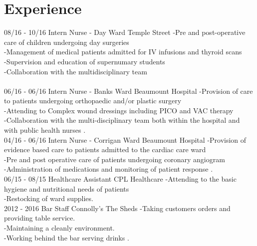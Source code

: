 \documentclass[]{friggeri-cv}
\begin{document}
\section{Experience}
\begin{entrylist}
  \entry
    {08/16 - 10/16}
    {Intern Nurse - Day Ward}
    {Temple Street}
    {-Pre and post-operative care of children undergoing day surgeries\\
-Management of medical patients admitted for IV infusions and thyroid scans\\
-Supervision and education of supernumary students\\
-Collaboration with the multidisciplinary team\\ 
\\}
  \entry
    {06/16 - 06/16}
    {Intern Nurse - Banks Ward}
    {Beaumount Hospital}
    {-Provision of care to patients undergoing orthopaedic and/or plastic surgery\\
-Attending to Complex wound dressings including PICO and VAC therapy\\
-Collaboration with the multi-disciplinary team both within the hospital and with public health nurses
.\\}
  \entry
    {04/16 - 06/16}
    {Intern Nurse - Corrigan Ward}
    {Beaumount Hospital}
    {-Provision of evidence based care to patients admitted to the cardiac care ward\\
-Pre and post operative care of patients undergoing coronary angiogram\\
-Administration of medications and monitoring of patient response
.\\}
 \entry
    {06/15 - 08/15}
    {Healthcare Assistant}
    {CPL Healthcare}
    {-Attending to the basic hygiene and nutritional needs of patients\\
-Restocking of ward supplies.\\} 
    \entry
    {2012 - 2016}
    {Bar Staff}
    {Connolly's The Sheds}
    {-Taking customers orders and providing table service.\\
-Maintaining a cleanly environment.\\
-Working behind the bar serving drinks
.\\}
\end{entrylist}
\end{document}
